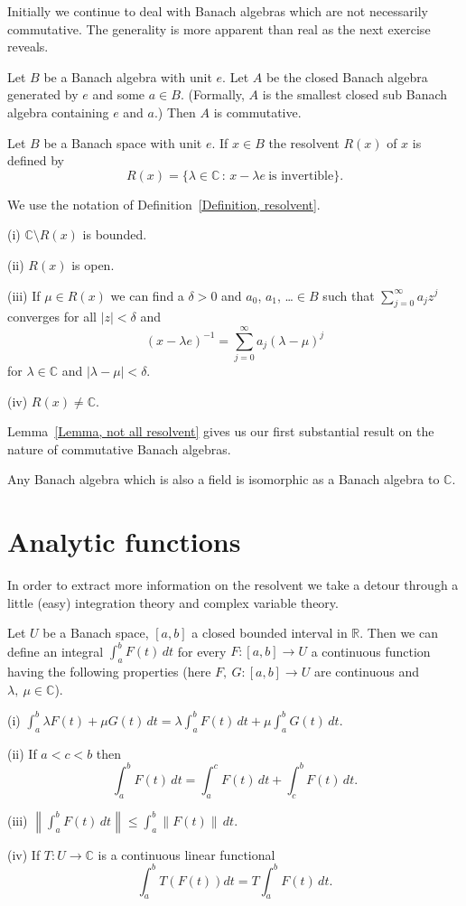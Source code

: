 Initially we continue to deal with Banach algebras which
are not necessarily commutative. The generality is
more apparent than real as the next exercise reveals.
\begin{exercise} Let $B$ be a Banach algebra with unit
$e$. Let $A$ be the closed Banach algebra generated by 
$e$ and some $a\in B$. (Formally, $A$ is the smallest closed sub
Banach algebra containing $e$ and $a$.) Then $A$ is
commutative.
\end{exercise}
\begin{definition}\label{Definition, resolvent}
Let $B$ be a Banach space with unit $e$.
If $x\in B$ the resolvent $R(x)$ of $x$ is defined by
\[R(x)=\{\lambda\in{\mathbb C}\,:\,x-\lambda e
\ \text{is invertible}\}.\]
\end{definition}
\begin{lemma}\label{Lemma, not all resolvent}
We use the notation of 
Definition~\ref{Definition, resolvent}.

(i) ${\mathbb C}\setminus R(x)$ is bounded.

(ii) $R(x)$ is open.

(iii) If $\mu\in R(x)$ we can find a $\delta>0$
and $a_{0}$, $a_{1}$, \dots $\in B$ such that
$\sum_{j=0}^{\infty}a_{j}z^{j}$ converges for all
$|z|<\delta$ and
\[(x-\lambda e)^{-1}=\sum_{j=0}^{\infty}a_{j}(\lambda-\mu)^{j}\]
for $\lambda\in{\mathbb C}$ and $|\lambda-\mu|<\delta$.

(iv) $R(x)\neq {\mathbb C}$.
\end{lemma}
Lemma~\ref{Lemma, not all resolvent} gives us our first
substantial result on the nature of commutative
Banach algebras.
\begin{theorem} Any Banach algebra which
is also a field is isomorphic as a Banach algebra to
${\mathbb C}$.
\end{theorem}
\section{Analytic functions}
In order to extract more information on the resolvent
we take a detour through a little (easy)
integration theory and complex variable theory.
\begin{theorem} Let $U$ be a Banach space, $[a,b]$
a closed bounded interval in ${\mathbb R}$.
Then we can define an integral $\int_{a}^{b}F(t)\,dt$
for every $F:[a,b]\rightarrow U$ a continuous function
having the following properties (here
$F,\ G:[a,b]\rightarrow U$ are continuous and 
$\lambda,\ \mu\in{\mathbb C}$).

(i) ${\displaystyle \int_{a}^{b}\lambda F(t)+\mu G(t)\,dt 
=\lambda \int_{a}^{b} F(t)\,dt
+\mu \int_{a}^{b} G(t)\,dt}$.

(ii) If $a<c<b$ then
\[ \int_{a}^{b} F(t)\,dt
=\int_{a}^{c} F(t)\,dt+\int_{c}^{b} F(t)\,dt.\]

(iii) ${\displaystyle \left\|\int_{a}^{b} F(t)\,dt\right\|
\leq \int_{a}^{b} \|F(t)\|\,dt.}$

(iv) If $T:U\rightarrow{\mathbb C}$ is a continuous
linear functional
\[ \int_{a}^{b}T (F(t))dt 
=T\int_{a}^{b} F(t)\,dt.\]
\end{theorem}

